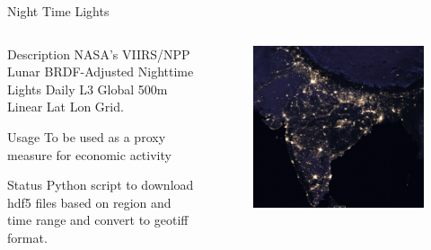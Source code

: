 \documentclass[t]{beamer}
\begin{document}
\begin{frame}{Night Time Lights}
    \vspace{-\blocktitlesize}
    \begin{columns}[T, totalwidth=\textwidth]
        \begin{column}{0.45\textwidth}
            \begin{block}{Description}
           NASA's VIIRS/NPP Lunar BRDF-Adjusted Nighttime Lights Daily L3 Global 500m Linear Lat Lon Grid.
            \end{block}
            \begin{block}{Usage}
            To be used as a proxy measure for economic activity
            \end{block}
            \begin{block}{Status}
            Python script to download hdf5 files based on region and time range and convert to geotiff format.
            \end{block}
        \end{column}
        \begin{column}{0.6\textwidth}
            \begin{figure}
                \vspace{-\blocktitlesize}
                \includegraphics[height=0.65\paperheight,keepaspectratio]{images/india-ntl.png}
                \label{fig:india_ntl}
            \end{figure}
        \end{column}
    \end{columns}
\end{frame}
\end{document}
